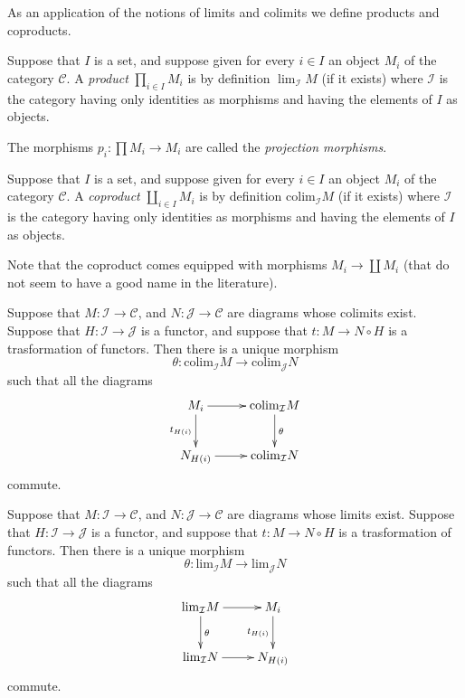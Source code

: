 \noindent
As an application of the notions of limits and colimits
we define products and coproducts.

\begin{definition}
\label{definition-product}
Suppose that $I$ is a set, and suppose given for every $i \in I$ an
object $M_i$ of the category $\mathcal{C}$. A {\it product}
$\prod_{i\in I} M_i$ is by definition $\lim_{\mathcal{I}} M$ 
(if it exists)
where $\mathcal{I}$ is the category having only identities as
morphisms and having the elements of $I$ as objects.
\end{definition}

\noindent
The morphisms $p_i : \prod M_i \to M_i$ are called the
{\it projection morphisms}.

\begin{definition}
\label{definition-coproduct}
Suppose that $I$ is a set, and suppose given for every $i \in I$ an
object $M_i$ of the category $\mathcal{C}$. A {\it coproduct}
$\coprod_{i\in I} M_i$ is by definition $\text{colim}_{\mathcal{I}} M$
(if it exists) where $\mathcal{I}$ is the category having only
identities as morphisms and having the elements of $I$ as objects.
\end{definition}

\noindent
Note that the coproduct comes equipped with morphisms
$M_i \to \coprod M_i$ (that do not seem to have a good
name in the literature).

\begin{lemma}
\label{lemma-functorial-colimit}
Suppose that $M : \mathcal{I} \to \mathcal{C}$,
and $N : \mathcal{J} \to \mathcal{C}$ are diagrams
whose colimits exist. Suppose that
$H : \mathcal{I} \to \mathcal{J}$ is 
a functor, and suppose that $t : M \to N \circ H$
is a trasformation of functors. 
Then there is a unique morphism
$$
\theta :
\text{colim}_{\mathcal{I}} M
\longrightarrow
\text{colim}_{\mathcal{J}} N
$$
such that all the diagrams
$$
\xymatrix{
M_i \ar[d]_{t_{H(i)}} \ar[r]
&
\text{colim}_{\mathcal{I}} M \ar[d]^{\theta}
\\
N_{H(i)} \ar[r]
&
\text{colim}_{\mathcal{I}} N
}
$$
commute.
\end{lemma}

\begin{lemma}
\label{lemma-functorial-limit}
Suppose that $M : \mathcal{I} \to \mathcal{C}$,
and $N : \mathcal{J} \to \mathcal{C}$ are diagrams
whose limits exist. Suppose that
$H : \mathcal{I} \to \mathcal{J}$ is 
a functor, and suppose that $t : M \to N \circ H$
is a trasformation of functors. 
Then there is a unique morphism
$$
\theta :
\text{lim}_{\mathcal{I}} M
\longrightarrow
\text{lim}_{\mathcal{J}} N
$$
such that all the diagrams
$$
\xymatrix{
\text{lim}_{\mathcal{I}} M \ar[d]^{\theta} \ar[r]
&
M_i \ar[d]_{t_{H(i)}}
\\
\text{lim}_{\mathcal{I}} N \ar[r]
&
N_{H(i)}
}
$$
commute.
\end{lemma}

